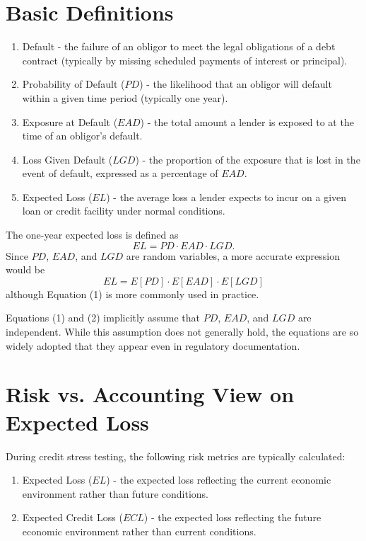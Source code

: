 \documentclass[11pt,a4paper]{article}
\begin{document}
\section{Basic Definitions}

\begin{enumerate}
\item Default - the failure of an obligor to meet the legal obligations of a debt contract (typically by missing scheduled payments of interest or principal).
\item Probability of Default ($PD$) - the likelihood that an obligor will default within a given time period (typically one year).
\item Exposure at Default ($EAD$) - the total amount a lender is exposed to at the time of an obligor's default.
\item Loss Given Default ($LGD$) - the proportion of the exposure that is lost in the event of default, expressed as a percentage of $EAD$.
\item Expected Loss ($EL$) - the average loss a lender expects to incur on a given loan or credit facility under normal conditions.
\end{enumerate}

The one-year expected loss is defined as
\begin{equation}
EL = PD \cdot EAD \cdot LGD.
\end{equation}
Since $PD$, $EAD$, and $LGD$ are random variables, a more accurate expression would be
\begin{equation}
EL = E[PD] \cdot E[EAD] \cdot E[LGD]
\end{equation}
although Equation (1) is more commonly used in practice.

Equations (1) and (2) implicitly assume that $PD$, $EAD$, and $LGD$ are independent. While this assumption does not generally hold, the equations are so widely adopted that they appear even in regulatory documentation.

\section{Risk vs. Accounting View on Expected Loss}

During credit stress testing, the following risk metrics are typically calculated:
\begin{enumerate}
\item Expected Loss ($EL$) - the expected loss reflecting the current economic environment rather than future conditions.
\item Expected Credit Loss ($ECL$) - the expected loss reflecting the future economic environment rather than current conditions.
\end{enumerate}
\end{document}

